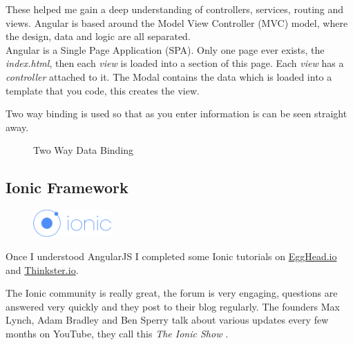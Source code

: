 These helped me gain a deep understanding of controllers, services, routing and views.
Angular is based around the Model View Controller (MVC) model, where the design, data and logic are all separated.
\\
Angular is a Single Page Application (SPA). Only one page ever exists, the \textit{index.html}, then each \textit{view} is loaded into a section of this page.
Each \textit{view} has a \textit{controller} attached to it. 
The Modal contains the data which is loaded into a template that you code, this creates the view.

Two way binding is used so that as you enter information is can be seen straight away.
\begin{figure}[H] 
	\caption{Two Way Data Binding}
	\label{fig:speciation}
\end{figure}

\pagebreak
\subsection{Ionic Framework}
\begin{figure}
	\includegraphics[width=3cm]{img/mobile-app/logos/ionic.png}
\end{figure} 
Once I understood AngularJS I completed some Ionic tutorials on \url{EggHead.io} and \url{Thinkster.io}.

The Ionic community is really great, the forum is very engaging, questions are answered very quickly and they post to their blog regularly.
The  founders Max Lynch, Adam Bradley and Ben Sperry talk about various updates every few months on YouTube, they call this \textit{The Ionic Show} \cite{ionic_show}.
\\

